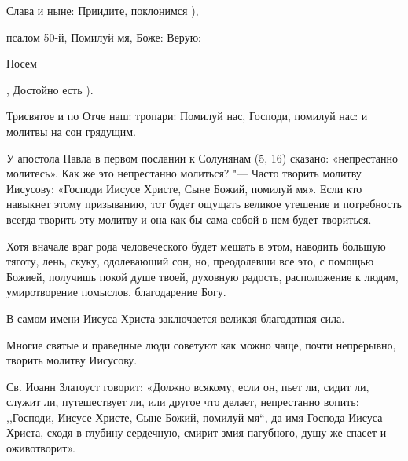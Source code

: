 {{{Слава и ныне: Приидите, поклонимся ), 

псалом 50-й, Помилуй мя, Боже: Верую: 


\bfseries 


Посем}, Достойно есть ). 

Трисвятое и по Отче наш: тропари: Помилуй нас, Господи, помилуй нас: и молитвы на сон грядущим. 








\mychapterending

 






У апостола Павла в первом послании к Солунянам (5, 16) сказано: «непрестанно молитесь». Как же это непрестанно молиться? "--- Часто творить молитву Иисусову: «Господи Иисусе Христе, Сыне Божий, помилуй мя». Если кто навыкнет этому призыванию, тот будет ощущать великое утешение и потребность всегда творить эту молитву и она как бы сама собой в нем будет твориться. 

Хотя вначале враг рода человеческого будет мешать в этом, наводить большую тяготу, лень, скуку, одолевающий сон, но, преодолевши все это, с помощью Божией, получишь покой душе твоей, духовную радость, расположение к людям, умиротворение помыслов, благодарение Богу. 

В самом имени Иисуса Христа заключается великая благодатная сила. 

Многие святые и праведные люди советуют как можно чаще, почти непрерывно, творить молитву Иисусову. 

Св. Иоанн Златоуст говорит: «Должно всякому, если он, пьет ли, сидит ли, служит ли, путешествует ли, или другое что делает, непрестанно вопить: ,,Господи, Иисусе Христе, Сыне Божий, помилуй мя``, да имя Господа Иисуса Христа, сходя в глубину сердечную, смирит змия пагубного, душу же спасет и оживотворит». 

}}
